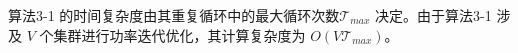 算法3-1 的时间复杂度由其重复循环中的最大循环次数$\mathcal{T}_{max}$ 决定。由于算法3-1 涉及 $V$ 个集群进行功率迭代优化，其计算复杂度为 $O(V\mathcal{T}_{max})$。

